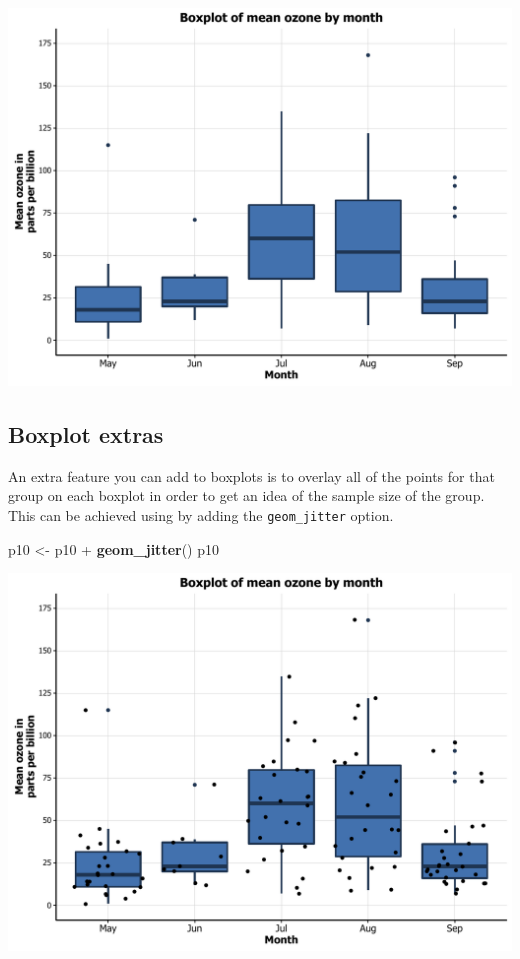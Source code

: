 \documentclass[]{article}
\newenvironment{Shaded}{\begin{snugshade}}{\end{snugshade}}
\newcommand{\KeywordTok}[1]{\textcolor[rgb]{0.13,0.29,0.53}{\textbf{{#1}}}}
\newcommand{\StringTok}[1]{\textcolor[rgb]{0.31,0.60,0.02}{{#1}}}
\newcommand{\NormalTok}[1]{{#1}}
\begin{document}
\begin{center}\includegraphics{0_all_posts_pdf/box_13-1} \end{center}

\subsection{Boxplot extras}\label{boxplot-extras}

An extra feature you can add to boxplots is to overlay all of the points
for that group on each boxplot in order to get an idea of the sample
size of the group. This can be achieved using by adding the
\texttt{geom\_jitter} option.

\begin{Shaded}
\begin{Highlighting}[]
\NormalTok{p10 <-}\StringTok{ }\NormalTok{p10 +}\StringTok{ }\KeywordTok{geom_jitter}\NormalTok{()}
\NormalTok{p10}
\end{Highlighting}
\end{Shaded}

\begin{center}\includegraphics{0_all_posts_pdf/box_14-1} \end{center}
\end{document}
